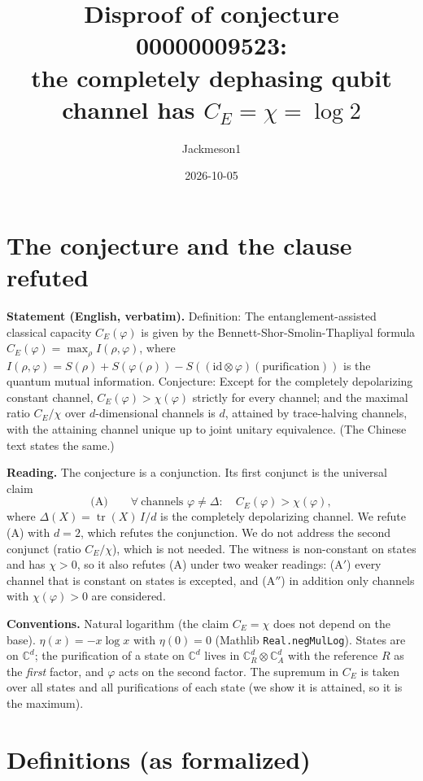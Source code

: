 \documentclass[11pt]{article}
\title{Disproof of conjecture 00000009523:\\ the completely dephasing qubit channel has $C_E=\chi=\log 2$}
\author{Jackmeson1}
\date{2026-10-05}
\theoremstyle{definition}
\newcommand{\tr}{\operatorname{tr}}
\newcommand{\nml}{\eta}
\begin{document}
\maketitle

\section{The conjecture and the clause refuted}

\textbf{Statement (English, verbatim).} Definition: The entanglement-assisted classical capacity
$C_E(\varphi)$ is given by the Bennett-Shor-Smolin-Thapliyal formula
$C_E(\varphi)=\max_\rho I(\rho,\varphi)$, where
$I(\rho,\varphi)=S(\rho)+S(\varphi(\rho))-S((\mathrm{id}\otimes\varphi)(\text{purification}))$ is the
quantum mutual information. Conjecture: Except for the completely depolarizing constant channel,
$C_E(\varphi)>\chi(\varphi)$ strictly for every channel; and the maximal ratio $C_E/\chi$ over
$d$-dimensional channels is $d$, attained by trace-halving channels, with the attaining channel
unique up to joint unitary equivalence. (The Chinese text states the same.)

\textbf{Reading.} The conjecture is a conjunction. Its first conjunct is the universal claim
\[
  \text{(A)}\qquad \forall\ \text{channels } \varphi \neq \Delta:\quad C_E(\varphi) > \chi(\varphi),
\]
where $\Delta(X)=\tr(X)\,I/d$ is the completely depolarizing channel. We refute (A) with $d=2$,
which refutes the conjunction. We do not address the second conjunct (ratio $C_E/\chi$), which is
not needed. The witness is non-constant on states and has $\chi>0$, so it also refutes (A) under
two weaker readings: (A$'$) every channel that is constant on states is excepted, and (A$''$) in
addition only channels with $\chi(\varphi)>0$ are considered.

\textbf{Conventions.} Natural logarithm (the claim $C_E=\chi$ does not depend on the base).
$\nml(x)=-x\log x$ with $\nml(0)=0$ (Mathlib \texttt{Real.negMulLog}). States are on
$\mathbb{C}^d$; the purification of a state on $\mathbb{C}^d$ lives in
$\mathbb{C}^d_R\otimes\mathbb{C}^d_A$ with the reference $R$ as the \emph{first} factor, and
$\varphi$ acts on the second factor. The supremum in $C_E$ is taken over all states and all
purifications of each state (we show it is attained, so it is the maximum).

\section{Definitions (as formalized)}
\end{document}
